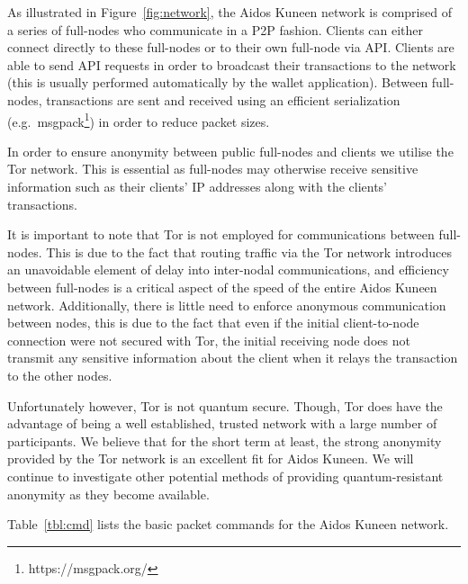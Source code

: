 \documentclass[a4paper,10pt,twocolumn]{article}
\begin{document}
	\vspace{-3.5mm}
	
	
	As illustrated in Figure~\ref{fig:network}, the Aidos Kuneen network is comprised of a series of full-nodes who communicate in a P2P fashion. 
	Clients can either connect directly to these full-nodes or to their own full-node via API\@. Clients are able to send API requests in order to broadcast their transactions to the network (this is usually performed automatically
	by the wallet application). Between full-nodes, transactions are sent and received using an efficient serialization (e.g.\ msgpack\footnote{https://msgpack.org/}) in order to reduce packet sizes.
	
	\vspace{2.5mm}
	
	In order to ensure anonymity between public full-nodes and clients we utilise the Tor network. This is essential as full-nodes
	may otherwise receive sensitive information such as their clients' IP addresses along with the clients' transactions.  
	
	\vspace{2.5mm}
	
	It is important to note that Tor is not employed for communications between full-nodes. This is due to the fact that routing traffic via the Tor network introduces an unavoidable element of delay into inter-nodal communications, and efficiency between full-nodes 
	is a critical aspect of the speed of the entire Aidos Kuneen network. Additionally, there is little need to enforce anonymous communication between nodes, this is due to the fact that even if the initial client-to-node connection were not secured with Tor, the initial receiving node 
	does not transmit any sensitive information about the client when it relays the transaction to the other nodes.
	
	\vspace{2.5mm}
	
	Unfortunately however, Tor is not quantum secure. Though, Tor does have the advantage of being a well established, trusted network with a large number of participants. We believe that for the short term at least, the strong anonymity provided 
	by the Tor network is an excellent fit for Aidos Kuneen. We will continue to investigate other potential methods of providing quantum-resistant anonymity as they become available. 
	
	\vspace{2.5mm}
	
	Table~\ref{tbl:cmd} lists the basic packet commands for the Aidos Kuneen network.
	
\end{document}
